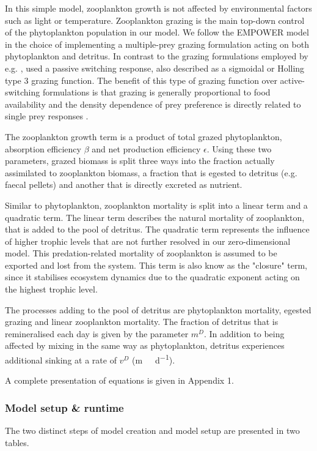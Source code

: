 \documentclass[journal abbreviations, manuscript]{copernicus}
\begin{document}
In this simple model, zooplankton growth is not affected by environmental factors such as light or temperature.
Zooplankton grazing is the main top-down control of the phytoplankton population in our model. We follow the EMPOWER model in the choice of implementing a multiple-prey grazing formulation acting on both phytoplankton and detritus. In contrast to the grazing formulations employed by e.g. \cite{Fasham1990a}, \citeauthor{Anderson2015c} used a passive switching response, also described as a sigmoidal or Holling type 3 grazing function. The benefit of this type of grazing function over active-switching formulations is that grazing is generally proportional to food availability and the density dependence of prey preference is directly related to single prey responses \citep{Gentleman2003a}.

The zooplankton growth term is a product of total grazed phytoplankton, absorption efficiency $\beta$ and net production efficiency $\epsilon$. Using these two parameters, grazed biomass is split three ways into the fraction actually assimilated to zooplankton biomass, a fraction that is egested to detritus (e.g. faecal pellets) and another that is directly excreted as nutrient. 

Similar to phytoplankton, zooplankton mortality is split into a linear term and a quadratic term. The linear term describes the natural mortality of zooplankton, that is added to the pool of detritus. The quadratic term represents the influence of higher trophic levels that are not further resolved in our zero-dimensional model. This predation-related mortality of zooplankton is assumed to be exported and lost from the system.
This term is also know as the "closure" term, since it stabilises ecosystem dynamics due to the quadratic exponent acting on the highest trophic level.

The processes adding to the pool of detritus are phytoplankton mortality, egested grazing and linear zooplankton mortality. The fraction of detritus that is remineralised each day is given by the parameter $m
^D$. In addition to being affected by mixing in the same way as phytoplankton, detritus experiences additional sinking at a rate of $v^D$ (\unit{m \ d^{-1}}).

A complete presentation of equations is given in Appendix 1.

\clearpage

\subsubsection{Model setup \& runtime}
The two distinct steps of model creation and model setup are presented in two tables. 
\end{document}
